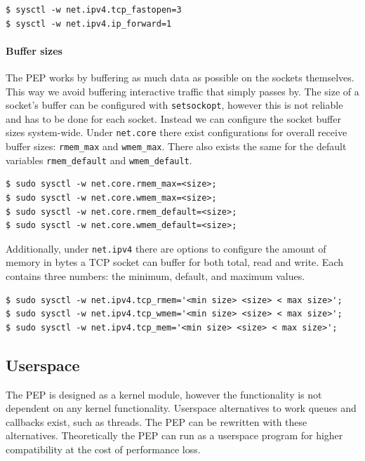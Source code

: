 \documentclass[a4paper,english, 12pt]{report}
\begin{document}
\begin{verbatim}
$ sysctl -w net.ipv4.tcp_fastopen=3
$ sysctl -w net.ipv4.ip_forward=1 
\end{verbatim}

\paragraph{Buffer sizes}
The PEP works by buffering as much data as possible on the sockets themselves. This way we avoid buffering interactive traffic that simply passes by. The size of a socket's buffer can be configured with \verb|setsockopt|, however this is not reliable and has to be done for each socket. Instead we can configure the socket buffer sizes system-wide. Under \verb|net.core| there exist configurations for overall receive buffer sizes: \verb|rmem_max| and \verb|wmem_max|. There also exists the same for the default variables \verb|rmem_default| and \verb|wmem_default|.\\

\begin{verbatim}
$ sudo sysctl -w net.core.rmem_max=<size>;
$ sudo sysctl -w net.core.wmem_max=<size>;
$ sudo sysctl -w net.core.rmem_default=<size>;
$ sudo sysctl -w net.core.wmem_default=<size>;
\end{verbatim}

Additionally, under \verb|net.ipv4| there are options to configure the amount of memory in bytes a TCP socket can buffer for both total, read and write. Each contains three numbers: the minimum, default, and maximum values.


\begin{verbatim}
$ sudo sysctl -w net.ipv4.tcp_rmem='<min size> <size> < max size>';
$ sudo sysctl -w net.ipv4.tcp_wmem='<min size> <size> < max size>';
$ sudo sysctl -w net.ipv4.tcp_mem='<min size> <size> < max size>';
\end{verbatim}

\subsection{Userspace}
The PEP is designed as a kernel module, however the functionality is not dependent on any kernel functionality. Userspace alternatives to work queues and callbacks exist, such as threads. The PEP can be rewritten with these alternatives. Theoretically the PEP can run as a userspace program for higher compatibility at the cost of performance loss.
\end{document}
